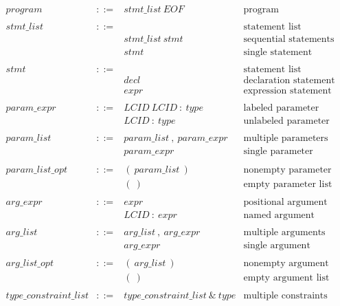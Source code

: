 $$
\begin{array}{llll}
program & ::= & stmt\_list\ EOF & \text{program} \\
\\
stmt\_list & ::= &                  & \text{statement list}        \\
           &     & stmt\_list\ stmt & \text{sequential statements} \\
           &     & stmt             & \text{single statement}      \\
\\
stmt & ::= &      & \text{statement list}        \\
     &     & decl & \text{declaration statement} \\
     &     & expr & \text{expression statement}  \\
\\
param\_expr & ::= & LCID\ LCID\ :\ type & \text{labeled parameter}   \\
            &     & LCID\ :\ type      & \text{unlabeled parameter} \\
\\
param\_list & ::= & param\_list\ ,\ param\_expr & \text{multiple parameters} \\
            &     & param\_expr                 & \text{single parameter}    \\
\\
param\_list\_opt & ::= & (\ param\_list\ ) & \text{nonempty parameter list} \\
                 &     & (\ )             & \text{empty parameter list}    \\
\\
arg\_expr & ::= & expr          & \text{positional argument} \\
          &     & LCID\ :\ expr & \text{named argument}      \\
\\
arg\_list & ::= & arg\_list\ ,\ arg\_expr & \text{multiple arguments} \\
          &     & arg\_expr               & \text{single argument}    \\
\\
arg\_list\_opt & ::= & (\ arg\_list\ ) & \text{nonempty argument list} \\
               &     & (\ )           & \text{empty argument list}    \\
\\
type\_constraint\_list & ::= & type\_constraint\_list\ \&\ type & \text{multiple constraints} \\

\end{array}$$
